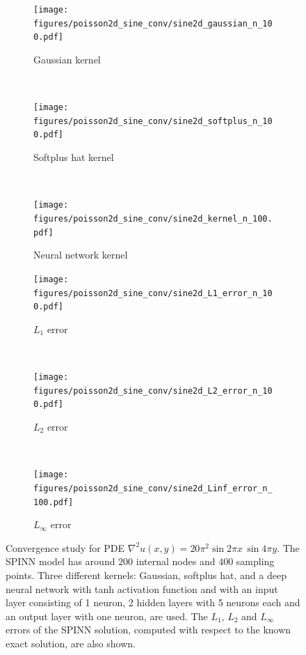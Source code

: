 \documentclass[12pt]{article}
\begin{document}
\begin{figure}
\begin{subfigure}{0.32\textwidth}
\centering
\texttt{[image: figures/poisson2d\_sine\_conv/sine2d\_gaussian\_n\_100.pdf]}
\caption{Gaussian kernel}
\label{fig:2d_A_gaussian_n_100}
\end{subfigure}
~
\begin{subfigure}{0.32\textwidth}
\centering
\texttt{[image: figures/poisson2d\_sine\_conv/sine2d\_softplus\_n\_100.pdf]}
\caption{Softplus hat kernel}
\label{fig:2d_A_softplus_n_100_a}
\end{subfigure}
~
\begin{subfigure}{0.32\textwidth}
\centering
\texttt{[image: figures/poisson2d\_sine\_conv/sine2d\_kernel\_n\_100.pdf]}
\caption{Neural network kernel}
\label{fig:2d_A_kernel_n_100}
\end{subfigure}
\begin{subfigure}{0.32\textwidth}
\centering
\texttt{[image: figures/poisson2d\_sine\_conv/sine2d\_L1\_error\_n\_100.pdf]}
\caption{$L_1$ error}
\label{fig:2d_A_L1_n_100}
\end{subfigure}
~
\begin{subfigure}{0.32\textwidth}
\centering
\texttt{[image: figures/poisson2d\_sine\_conv/sine2d\_L2\_error\_n\_100.pdf]}
\caption{$L_2$ error}
\label{fig:2d_A_L2_n_100}
\end{subfigure}
~
\begin{subfigure}{0.32\textwidth}
\centering
\texttt{[image: figures/poisson2d\_sine\_conv/sine2d\_Linf\_error\_n\_100.pdf]}
\caption{$L_{\infty}$ error}
\label{fig:2d_A_Linf_n_100_a}
\end{subfigure}
\caption{Convergence study for PDE $\nabla^2 u(x, y) = 20\pi^2 \sin 2\pi x \, \sin 4 \pi y$. The SPINN model has around $200$ internal nodes and $400$ sampling points. Three different kernels: Gaussian, softplus hat, and a deep neural network with tanh activation function and with an input layer consisting of 1 neuron, 2 hidden layers with 5 neurons each and an output layer with one neuron, are used. The $L_1$, $L_2$ and $L_{\infty}$ errors of the SPINN solution, computed with respect to the known exact solution, are also shown.}
\label{fig:sine2d_conv_activation}
\end{figure}
\end{document}
